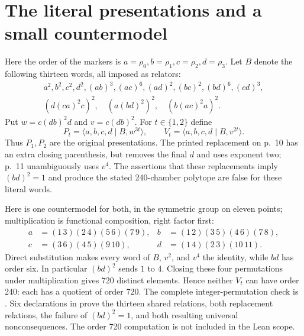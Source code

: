 \section{The literal presentations and a small countermodel}
Here the order of the markers is
$a=\rho_0,b=\rho_1,c=\rho_2,d=\rho_3$.
Let $B$ denote the following thirteen words, all imposed as relators:
\begin{gather*}
 a^2,b^2,c^2,d^2,(ab)^3,(ac)^6,(ad)^2,(bc)^2,(bd)^6,(cd)^3,\\
 (d(ca)^2c)^2,\quad (a(bd)^2)^2,\quad (b(ac)^2a)^2.
\end{gather*}
Put $w=c(db)^2d$ and $v=c(db)^2$. For $t\in\{1,2\}$ define
\[
 P_t=\langle a,b,c,d\mid B,w^{3t}\rangle,\qquad
 V_t=\langle a,b,c,d\mid B,v^{2t}\rangle.                 \tag{F.1}
\]
Thus $P_1,P_2$ are the original presentations. The printed replacement
on p.~10 has an extra closing parenthesis, but removes the final $d$
and uses exponent two; p.~11 unambiguously uses $v^4$.
The assertions that these replacements imply $(bd)^2=1$ and produce
the stated 240-chamber polytope are false for these literal words.

Here is one countermodel for both, in the symmetric group on eleven
points; multiplication is functional composition, right factor first:
\begin{align*}
 a&=(1\,3)(2\,4)(5\,6)(7\,9),&
 b&=(1\,2)(3\,5)(4\,6)(7\,8),\\
 c&=(3\,6)(4\,5)(9\,10),&
 d&=(1\,4)(2\,3)(10\,11).
\end{align*}
Direct substitution makes every word of $B$, $v^2$, and $v^4$ the
identity, while $bd$ has order six. In particular $(bd)^2$ sends
$1$ to $4$. Closing these four permutations under multiplication gives
720 distinct elements. Hence neither $V_t$ can have order 240: each
has a quotient of order 720. The complete integer-permutation check is
. Six declarations in 
prove the thirteen shared relations, both replacement relations,
the failure of $(bd)^2=1$, and both resulting universal nonconsequences.
The order 720 computation is not included in the Lean scope.

